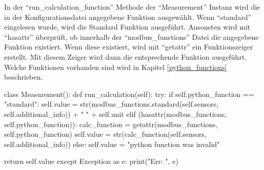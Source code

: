 In der \enquote{run\_calculation\_function} Methode der \enquote{Measurement} Instanz wird die in der Konfigurationsdatei angegebene Funktion ausgewählt. Wenn \enquote{standard} eingelesen wurde, wird die Standard Funktion ausgeführt. Ansonsten wird mit \enquote{hasattr} überprüft, ob innerhalb der \enquote{modbus\_functions} Datei die angegebene Funktion existiert. Wenn diese existiert, wird mit \enquote{getattr} ein Funktionszeiger erstellt. Mit diesem Zeiger wird dann die entsprechende Funktion ausgeführt. Welche Funktionen vorhanden sind wird in Kapitel \ref{python_functions} beschrieben. 

\begin{pythoncode}
class Measurement():
	def run_calculation(self):
		try:
			if self.python_function == "standard":
				self.value = str(modbus_functions.standard(self.sensors, self.additional_info)) + " " + self.unit
			elif (hasattr(modbus_functions, self.python_function)):
				calc_function = getattr(modbus_functions, self.python_function)
				self.value = str(calc_function(self.sensors, self.additional_info))
			else:
				self.value = "python function was invalid"
		
			return self.value
		except Exception as e:
			print("Err: ", e)
\end{pythoncode}